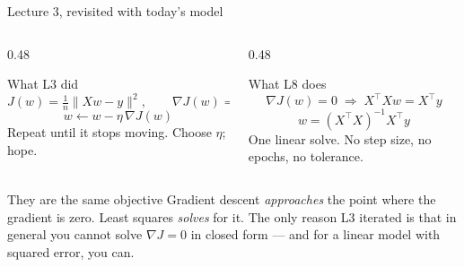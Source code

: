 \documentclass[aspectratio=169]{beamer}
\begin{document}
\begin{frame}[shrink=6]{Lecture 3, revisited with today's model}
  \begin{columns}[T]
    \begin{column}{0.48\textwidth}
      \begin{block}{What L3 did}
        \small
        \[ J(w) = \tfrac1n\lVert Xw - y\rVert^2,\qquad
           \nabla J(w) = \tfrac2n X^{\!\top}(Xw - y) \]
        \[ w \leftarrow w - \eta\,\nabla J(w) \]
        Repeat until it stops moving. Choose $\eta$; hope.
      \end{block}
    \end{column}
    \begin{column}{0.48\textwidth}
      \begin{exampleblock}{What L8 does}
        \small
        \[ \nabla J(w) = 0
           \;\Longrightarrow\;
           X^{\!\top}\!Xw = X^{\!\top}y \]
        \[ w = (X^{\!\top}\!X)^{-1}X^{\!\top}y \]
        One linear solve. No step size, no epochs, no tolerance.
      \end{exampleblock}
    \end{column}
  \end{columns}
  \vspace{0.2em}
  \begin{alertblock}{They are the same objective}
    \small Gradient descent \emph{approaches} the point where the gradient is
    zero. Least squares \emph{solves} for it. The only reason L3 iterated is
    that in general you cannot solve $\nabla J = 0$ in closed form --- and
    for a linear model with squared error, you can.
  \end{alertblock}
\end{frame}
\end{document}
